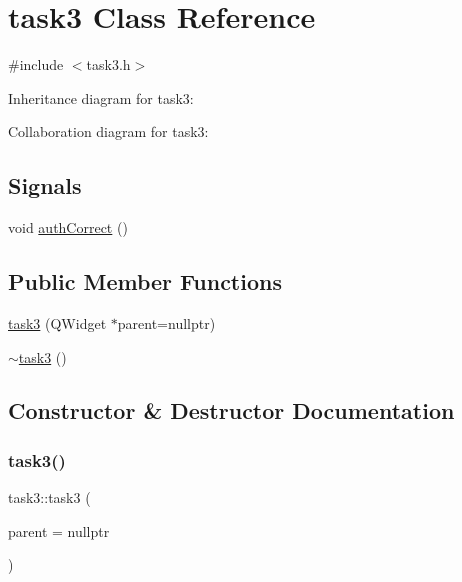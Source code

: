 \hypertarget{classtask3}{}\section{task3 Class Reference}
\label{classtask3}


{\ttfamily \#include $<$task3.\+h$>$}



Inheritance diagram for task3\+:


Collaboration diagram for task3\+:
\subsection*{Signals}
\begin{DoxyCompactItemize}
\item 
void \mbox{\hyperlink{classtask3_aa3b4c71fbe1fe7cd10bbf4d423073307}{auth\+Correct}} ()
\end{DoxyCompactItemize}
\subsection*{Public Member Functions}
\begin{DoxyCompactItemize}
\item 
\mbox{\hyperlink{classtask3_a0a6027f3581e90122179cef68a7d5331}{task3}} (Q\+Widget $\ast$parent=nullptr)
\item 
\mbox{\hyperlink{classtask3_ad2e55a3c68b7378fd4d917c7a700de58}{$\sim$task3}} ()
\end{DoxyCompactItemize}


\subsection{Constructor \& Destructor Documentation}
\mbox{\label{classtask3_a0a6027f3581e90122179cef68a7d5331}} 
\subsubsection{\texorpdfstring{task3()}{task3()}}
{\footnotesize\ttfamily task3\+::task3 (\begin{DoxyParamCaption}\item[{Q\+Widget $\ast$}]{parent = {\ttfamily nullptr} }\end{DoxyParamCaption})\hspace{0.3cm}{\ttfamily [explicit]}}

